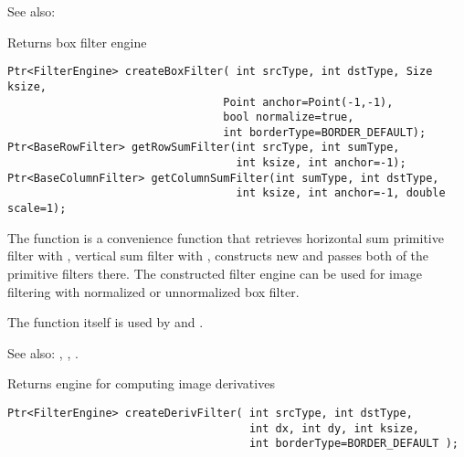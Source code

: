 See also: 

Returns box filter engine

\begin{lstlisting}
Ptr<FilterEngine> createBoxFilter( int srcType, int dstType, Size ksize,
                                 Point anchor=Point(-1,-1),
                                 bool normalize=true,
                                 int borderType=BORDER_DEFAULT);
Ptr<BaseRowFilter> getRowSumFilter(int srcType, int sumType,
                                   int ksize, int anchor=-1);
Ptr<BaseColumnFilter> getColumnSumFilter(int sumType, int dstType,
                                   int ksize, int anchor=-1, double scale=1);
\end{lstlisting}
\begin{description}
\end{description}

The function is a convenience function that retrieves horizontal sum primitive filter with , vertical sum filter with , constructs new  and passes both of the primitive filters there. The constructed filter engine can be used for image filtering with normalized or unnormalized box filter.

The function itself is used by  and .

See also: , , .

Returns engine for computing image derivatives 

\begin{lstlisting}
Ptr<FilterEngine> createDerivFilter( int srcType, int dstType,
                                     int dx, int dy, int ksize,
                                     int borderType=BORDER_DEFAULT );
\end{lstlisting}
\begin{description}
\end{description}

